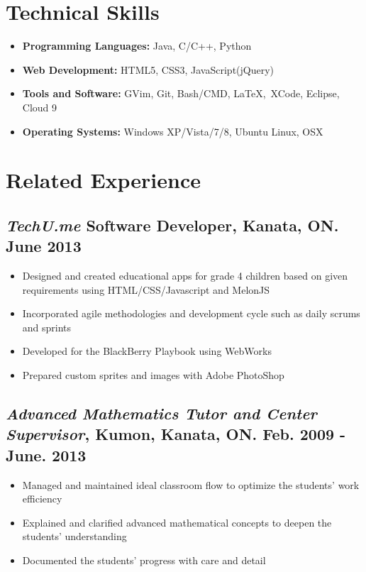\documentclass[12pt]{article}
\begin{document}
\section*{Technical Skills} \vspace{-12pt}
	\begin{itemize}
	\item \textbf{Programming Languages:} Java, C/C++, Python
	\item \textbf{Web Development:} HTML5, CSS3, JavaScript(jQuery)
	\item \textbf{Tools and Software:} GVim, Git, Bash/CMD,  \LaTeX,\  XCode, Eclipse, Cloud 9	
	\item \textbf{Operating Systems:} Windows XP/Vista/7/8, Ubuntu Linux, OSX
	\end{itemize}

\section*{Related Experience} \vspace{-12pt}
	\subsection*{\textit{TechU.me} Software Developer, Kanata, ON. June 2013}
		\begin{itemize} \vspace{-10pt}
		\item Designed and created educational apps for grade 4 children based on given requirements using 			 	HTML/CSS/Javascript and MelonJS
		\item Incorporated agile methodologies and development cycle such as daily scrums and sprints
		\item Developed for the BlackBerry Playbook using WebWorks
		\item Prepared custom sprites and images with Adobe PhotoShop
		\end{itemize}	
	\subsection*{\textit{Advanced Mathematics Tutor and Center Supervisor}, Kumon, Kanata, ON. Feb. 2009 - June. 2013}
		\begin{itemize} \vspace{-10pt}
		\item Managed and maintained ideal classroom flow to optimize the students' work efficiency
		\item Explained and clarified advanced mathematical concepts to deepen the students' understanding
		\item Documented the students' progress with care and detail
		\end{itemize}
\end{document}
